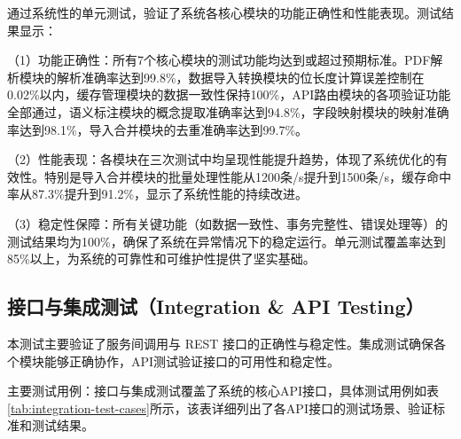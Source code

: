 \begin{table}[H]
    \centering
\caption{导入合并模块单元测试结果}
\label{tab:import-merge-test}
\end{table}

通过系统性的单元测试，验证了系统各核心模块的功能正确性和性能表现。测试结果显示：

（1）功能正确性：所有7个核心模块的测试功能均达到或超过预期标准。PDF解析模块的解析准确率达到99.8\%，数据导入转换模块的位长度计算误差控制在0.02\%以内，缓存管理模块的数据一致性保持100\%，API路由模块的各项验证功能全部通过，语义标注模块的概念提取准确率达到94.8\%，字段映射模块的映射准确率达到98.1\%，导入合并模块的去重准确率达到99.7\%。

（2）性能表现：各模块在三次测试中均呈现性能提升趋势，体现了系统优化的有效性。特别是导入合并模块的批量处理性能从1200条/s提升到1500条/s，缓存命中率从87.3\%提升到91.2\%，显示了系统性能的持续改进。

（3）稳定性保障：所有关键功能（如数据一致性、事务完整性、错误处理等）的测试结果均为100\%，确保了系统在异常情况下的稳定运行。单元测试覆盖率达到85\%以上，为系统的可靠性和可维护性提供了坚实基础。


\subsection{接口与集成测试（Integration \& API Testing）}

本测试主要验证了服务间调用与 REST 接口的正确性与稳定性。集成测试确保各个模块能够正确协作，API测试验证接口的可用性和稳定性。


主要测试用例：接口与集成测试覆盖了系统的核心API接口，具体测试用例如表\ref{tab:integration-test-cases}所示，该表详细列出了各API接口的测试场景、验证标准和测试结果。

